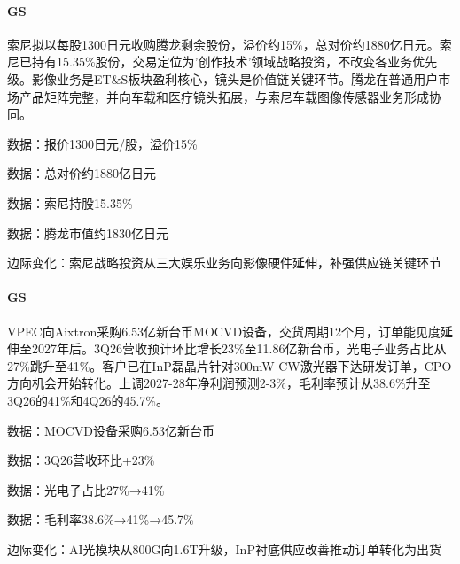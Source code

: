 \documentclass[11pt]{ctexart}
\begin{document}
\paragraph{GS} 索尼拟以每股1300日元收购腾龙剩余股份，溢价约15\%，总对价约1880亿日元。索尼已持有15.35\%股份，交易定位为'创作技术'领域战略投资，不改变各业务优先级。影像业务是ET\&S板块盈利核心，镜头是价值链关键环节。腾龙在普通用户市场产品矩阵完整，并向车载和医疗镜头拓展，与索尼车载图像传感器业务形成协同。
{\small\color{refgray}数据：报价1300日元/股，溢价15\%\par}
{\small\color{refgray}数据：总对价约1880亿日元\par}
{\small\color{refgray}数据：索尼持股15.35\%\par}
{\small\color{refgray}数据：腾龙市值约1830亿日元\par}
{\small\color{refgray}边际变化：索尼战略投资从三大娱乐业务向影像硬件延伸，补强供应链关键环节\par}
\paragraph{GS} VPEC向Aixtron采购6.53亿新台币MOCVD设备，交货周期12个月，订单能见度延伸至2027年后。3Q26营收预计环比增长23\%至11.86亿新台币，光电子业务占比从27\%跳升至41\%。客户已在InP磊晶片针对300mW CW激光器下达研发订单，CPO方向机会开始转化。上调2027-28年净利润预测2-3\%，毛利率预计从38.6\%升至3Q26的41\%和4Q26的45.7\%。
{\small\color{refgray}数据：MOCVD设备采购6.53亿新台币\par}
{\small\color{refgray}数据：3Q26营收环比+23\%\par}
{\small\color{refgray}数据：光电子占比27\%→41\%\par}
{\small\color{refgray}数据：毛利率38.6\%→41\%→45.7\%\par}
{\small\color{refgray}边际变化：AI光模块从800G向1.6T升级，InP衬底供应改善推动订单转化为出货\par}
\end{document}
